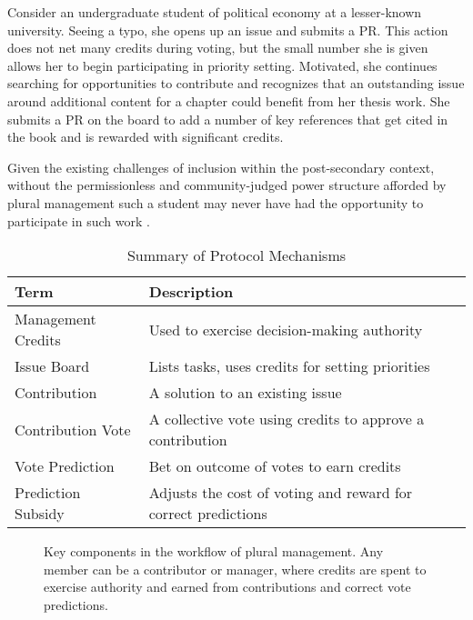 \documentclass{article}
\begin{document}
Consider an undergraduate student of political economy at a lesser-known university. Seeing a typo, she opens up an issue and submits a PR. This action does not net many credits during voting, but the small number she is given allows her to begin participating in priority setting. Motivated, she continues searching for opportunities to contribute and recognizes that an outstanding issue around additional content for a chapter could benefit from her thesis work. She submits a PR on the board to add a number of key references that get cited in the book and is rewarded with significant credits.

Given the existing challenges of inclusion within the post-secondary context, without the permissionless and community-judged power structure afforded by plural management such a student may never have had the opportunity to participate in such work \cite{gvozdanovic2018implicit}.

\begin{table}[h]
    \centering
    \caption{Summary of Protocol Mechanisms}
    \begin{tabular}{ll}
        \toprule
        Term & Description \\
        \midrule
        Management Credits & Used to exercise decision-making authority \\
        Issue Board & Lists tasks, uses credits for setting priorities \\
        Contribution & A solution to an existing issue \\
        Contribution Vote & A collective vote using credits to approve a contribution \\
        Vote Prediction & Bet on outcome of votes to earn credits \\
        Prediction Subsidy & Adjusts the cost of voting and reward for correct predictions \\
        \bottomrule
    \end{tabular}
\end{table}

\begin{figure}[h]
    \centering
    \caption{Key components in the workflow of plural management. Any member can be a contributor or manager, where credits are spent to exercise authority and earned from contributions and correct vote predictions.}
\end{figure}
\end{document}
